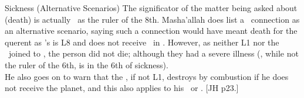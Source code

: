 \begin{frame}[t]{Sickness (Alternative Scenarios)}
The significator of the matter being asked about (death) is actually \Mars\ as the ruler of the 8th. Masha'allah does list a \Mars\ connection as an alternative scenario, saying such a connection would have meant death for the querent as \Mars's is L8 and does not receive \Venus\ in \Pisces. However, as neither L1 nor the \Moon\ joined to \Mars, the person did not die; although they had a severe illness (\Venus, while not the ruler of the 6th, is in the 6th of sickness).\\

\vspace{0.2cm}
He also goes on to warn that the \Sun, if not L1, destroys by combustion if he does not receive the planet, and this also applies to his \Square\ or \Opposition. [JH p23.]\footnotemark[1]

\end{frame}